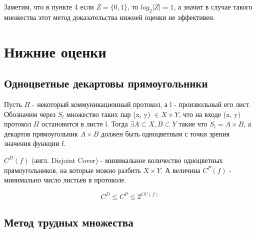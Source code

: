 \documentclass[12pt]{article}
\begin{document}
Заметим, что в пункте 4 если $Z=\{0,1\}$, то $log_2|Z| = 1$, а значит в случае такого множества этот метод доказательства нижней оценки не эффективен.

\section{Нижние оценки}
\subsection{Одноцветные декартовы прямоугольники}

\begin{Statement}
Пусть $\Pi$ - некоторый коммуникационный протокол, а l - произвольный его лист.
Обозначим через $S_l$ множество таких пар (x, y) $\in X \times Y$,
что на входе (x, y) протокол $\Pi$ остановится в листе l.
Тогда $\exists A \subset X, B \subset Y$ такие что $S_l = A \times B$, а декартов прямоугольник $A \times B$ должен быть одноцветным с точки зрения значения функции f.
\end{Statement}

\begin{Def}
    $C^D(f)$ (англ. Disjoint Cover) - минимальное количество одноцветных прямоугольников, на которые можно разбить $X \times Y$.
    А величина $C^P(f)$ - минимально число листьев в протоколе.
\end{Def}

\begin{Statement}
    $$C^D \leq C^P \leq 2^{CC(f)}$$
\end{Statement}

\subsection{Метод трудных множества}
\end{document}
